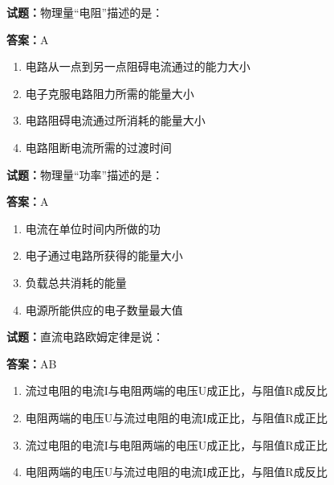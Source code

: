 \documentclass{ctexbook}
\begin{document}




\vspace{1em}

\textbf{试题：}物理量“电阻”描述的是： 

\textbf{答案：}A 

\begin{enumerate}[leftmargin=3em]
  \item 电路从一点到另一点阻碍电流通过的能力大小 

  \item 电子克服电路阻力所需的能量大小 


  \item 电路阻碍电流通过所消耗的能量大小 

  \item 电路阻断电流所需的过渡时间 

\end{enumerate}





\vspace{1em}

\textbf{试题：}物理量“功率”描述的是： 

\textbf{答案：}A 

\begin{enumerate}[leftmargin=3em]
  \item 电流在单位时间内所做的功 

  \item 电子通过电路所获得的能量大小 

  \item 负载总共消耗的能量 

  \item 电源所能供应的电子数量最大值 

\end{enumerate}





\vspace{1em}

\textbf{试题：}直流电路欧姆定律是说： 

\textbf{答案：}AB 

\begin{enumerate}[leftmargin=3em]
  \item 流过电阻的电流I与电阻两端的电压U成正比，与阻值R成反比 

  \item 电阻两端的电压U与流过电阻的电流I成正比，与阻值R成正比 

  \item 流过电阻的电流I与电阻两端的电压U成正比，与阻值R成正比 

  \item 电阻两端的电压U与流过电阻的电流I成正比，与阻值R成反比 

\end{enumerate}
\end{document}

